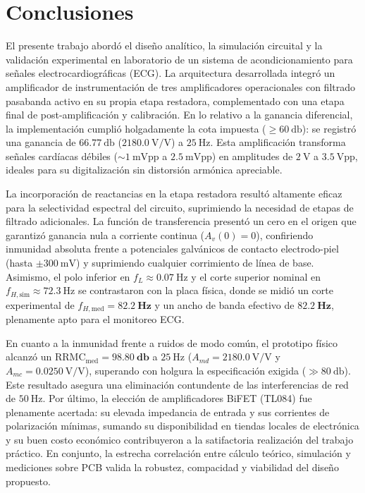 \chapter{Conclusiones}
\label{sec:conclusiones}

El presente trabajo abordó el diseño analítico, la simulación circuital y la
validación experimental en laboratorio de un sistema de acondicionamiento para
señales electrocardiográficas (ECG). La arquitectura desarrollada integró un
amplificador de instrumentación de tres amplificadores operacionales con
filtrado pasabanda activo en su propia etapa restadora, complementado con una
etapa final de post-amplificación y calibración. En lo relativo a la ganancia
diferencial, la implementación cumplió holgadamente la cota impuesta ($\ge
\SI{60}{\decibel}$): 
se registró una ganancia de $\SI{66.77}{\decibel}$ ($2180.0\ \text{V/V}$) a
$\SI{25}{\hertz}$. Esta amplificación transforma señales cardíacas débiles
($\sim \SI{1}{\milli\volt\text{pp}}$ a $\SI{2.5}{\milli\volt\text{pp}}$) en
amplitudes de $\SI{2}{\volt}$ a $\SI{3.5}{\volt\text{pp}}$, ideales
para su digitalización sin distorsión armónica apreciable.

La incorporación de reactancias en la etapa restadora resultó altamente eficaz
para la selectividad espectral del circuito, suprimiendo la necesidad de etapas
de filtrado adicionales. La función de transferencia presentó un cero en el
origen que garantizó ganancia nula a corriente continua ($A_v(0) = 0$),
confiriendo inmunidad absoluta frente a potenciales galvánicos de contacto
electrodo-piel (hasta $\pm \SI{300}{\milli\volt}$) y suprimiendo cualquier
corrimiento de línea de base. Asimismo, el polo inferior en $f_L \approx
\SI{0.07}{\hertz}$ y el corte superior nominal en $f_{H,\text{sim}} \approx
\SI{72.3}{\hertz}$ se contrastaron con la placa física, donde se midió un corte
experimental de $f_{H,\text{med}} = \mathbf{\SI{82.2}{\hertz}}$ y un ancho de
banda efectivo de $\mathbf{\SI{82.2}{\hertz}}$, plenamente apto para el
monitoreo ECG. 

En cuanto a la inmunidad frente a ruidos de modo común, el prototipo físico
alcanzó un $\text{RRMC}_{\text{med}} = \mathbf{\SI{98.80}{\decibel}}$ a
$\SI{25}{\hertz}$ ($A_{md} = 2180.0\ \text{V/V}$ y $A_{mc} = 0.0250\
\text{V/V}$), superando con holgura la especificación exigida ($\gg
\SI{80}{\decibel}$). Este resultado asegura una eliminación contundente de las
interferencias de red de $\SI{50}{\hertz}$. Por último, la elección de
amplificadores BiFET (TL084) fue plenamente acertada: su elevada impedancia de
entrada  y sus corrientes de polarización mínimas, sumando su disponibilidad en
tiendas locales de electrónica y su buen costo económico contribuyeron a la
satifactoria realización del trabajo práctico. En conjunto, la estrecha
correlación entre cálculo teórico, simulación y mediciones sobre PCB valida la
robustez, compacidad y viabilidad del diseño propuesto.
